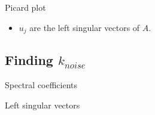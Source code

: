 \documentclass{beamer}
\begin{document}
\begin{frame}{Picard plot}
  \begin{center}
  \end{center}
  \begin{itemize}
    \item $u_{j}$ are the left singular vectors of $A$.
  \end{itemize}
\end{frame}

\subsection{Finding $k_{noise}$}
\begin{frame}{Spectral coefficients}
  \begin{center}
  \end{center}
\end{frame}

\begin{frame}{Left singular vectors}
  \begin{center}
  \end{center}
\end{frame}
\end{document}
